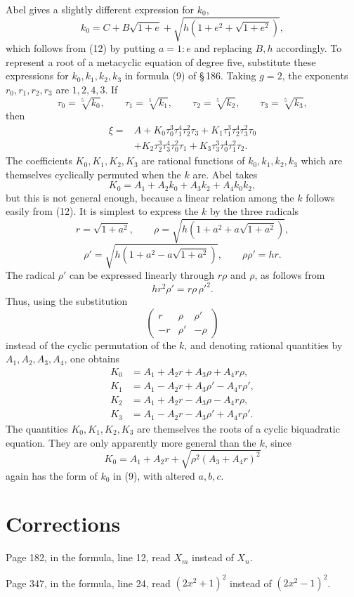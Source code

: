 \documentclass[11pt]{article}
\begin{document}
Abel gives a slightly different expression for $k_0$,
\[
  k_0=C+B\sqrt{1+e}+\sqrt{h(1+e^2+\sqrt{1+e^2})},
\]
which follows from (12) by putting $a=1:e$ and replacing $B,h$ accordingly. To represent a root of a metacyclic equation of degree five, substitute these expressions for $k_0,k_1,k_2,k_3$ in formula (9) of \S\,186. Taking $g=2$, the exponents $r_0,r_1,r_2,r_3$ are $1,2,4,3$. If
\[
  \tau_0=\sqrt[5]{k_0},\qquad \tau_1=\sqrt[5]{k_1},\qquad
  \tau_2=\sqrt[5]{k_2},\qquad \tau_3=\sqrt[5]{k_3},
\]
then
\begin{equation}\tag{13}
\begin{aligned}
 \xi={}&A+K_0\tau_0^3\tau_1^4\tau_2^2\tau_3
      +K_1\tau_1^3\tau_2^4\tau_3^2\tau_0\\
     &+K_2\tau_2^3\tau_3^4\tau_0^2\tau_1
      +K_3\tau_3^3\tau_0^4\tau_1^2\tau_2.
\end{aligned}
\end{equation}
The coefficients $K_0,K_1,K_2,K_3$ are rational functions of $k_0,k_1,k_2,k_3$ which are themselves cyclically permuted when the $k$ are. Abel takes
\[
  K_0=A_1+A_2k_0+A_3k_2+A_4k_0k_2,
\]
but this is not general enough, because a linear relation among the $k$ follows easily from (12). It is simplest to express the $k$ by the three radicals
\[
  r=\sqrt{1+a^2},\qquad
  \rho=\sqrt{h(1+a^2+a\sqrt{1+a^2})},
\]
\[
  \rho'=\sqrt{h(1+a^2-a\sqrt{1+a^2})},\qquad \rho\rho'=hr.
\]
The radical $\rho'$ can be expressed linearly through $r\rho$ and $\rho$, as follows from
\[
  hr^2\rho'=r\rho\,\rho'^2.
\]
Thus, using the substitution
\[
  \begin{pmatrix} r&\rho&\rho'\\ -r&\rho'&-\rho\end{pmatrix}
\]
instead of the cyclic permutation of the $k$, and denoting rational quantities by $A_1,A_2,A_3,A_4$, one obtains
\begin{equation}\tag{14}
\begin{aligned}
 K_0&=A_1+A_2r+A_3\rho+A_4r\rho,\\
 K_1&=A_1-A_2r+A_3\rho'-A_4r\rho',\\
 K_2&=A_1+A_2r-A_3\rho-A_4r\rho,\\
 K_3&=A_1-A_2r-A_3\rho'+A_4r\rho'.
\end{aligned}
\end{equation}
The quantities $K_0,K_1,K_2,K_3$ are themselves the roots of a cyclic biquadratic equation. They are only apparently more general than the $k$, since
\[
  K_0=A_1+A_2r+\sqrt{\rho^2(A_3+A_4r)^2}
\]
again has the form of $k_0$ in (9), with altered $a,b,c$.

\section*{Corrections}

Page 182, in the formula, line 12, read $X_m$ instead of $X_n$.

Page 347, in the formula, line 24, read $(2x^2+1)^2$ instead of $(2x^2-1)^2$.
\end{document}
